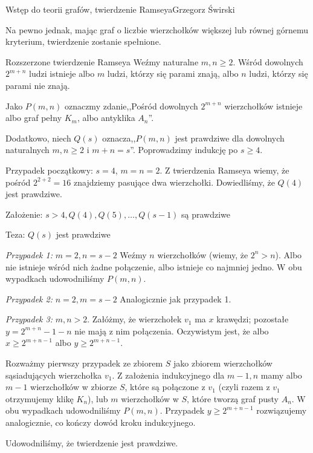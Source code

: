\begin{referat}{Wstęp do teorii grafów, twierdzenie Ramseya}{Grzegorz Świrski}
\begin{teoria}
Na pewno jednak, mając graf o liczbie wierzchołków większej lub równej górnemu kryterium, twierdzenie zostanie spełnione.

\begin{twierdzenie}{Rozszerzone twierdzenie Ramseya}
Weźmy naturalne $m, n \geq 2$. Wśród dowolnych $2^{m+n}$ ludzi istnieje albo $m$ ludzi, którzy się parami znają, albo $n$ ludzi, którzy się parami nie znają.
\end{twierdzenie}

\begin{dowod}
Jako $P(m, n)$ oznaczmy zdanie,,Pośród dowolnych $2^{m+n}$ wierzchołków istnieje albo graf pełny $K_m$, albo antyklika $A_n$''.

Dodatkowo, niech $Q(s)$ oznacza,,$P(m,n)$ jest prawdziwe dla dowolnych naturalnych $m,n \geq 2$ i $m+n = s$''. Poprowadzimy indukcję po $s \geq 4$.

Przypadek początkowy: $s = 4$, $m=n=2$. Z twierdzenia Ramseya wiemy, że pośród $2^{2+2} = 16$ znajdziemy pasujące dwa wierzchołki. Dowiedliśmy, że $Q(4)$ jest prawdziwe.

Założenie: $s > 4, Q(4), Q(5), \ldots, Q(s-1)$ są prawdziwe

Teza: $Q(s)$ jest prawdziwe

\emph{Przypadek 1:} $m=2, n=s-2$ Weźmy $n$ wierzchołków (wiemy, że $2^n > n$). Albo nie istnieje wśród nich żadne połączenie, albo istnieje co najmniej jedno. W obu wypadkach udowodniliśmy $P(m,n)$.

\emph{Przypadek 2:} $n=2, m = s-2$ Analogicznie jak przypadek 1.

\emph{Przypadek 3:} $m,n > 2$. Załóżmy, że wierzchołek $v_1$ ma $x$ krawędzi; pozostałe $y = 2^{m+n} - 1 - n$ nie mają z nim połączenia. Oczywistym jest, że albo $x \geq 2^{m+n-1}$ albo $y \geq 2^{m+n-1}$.

Rozważmy pierwszy przypadek ze zbiorem $S$ jako zbiorem wierzchołków sąsiadujących wierzchołka $v_1$. Z założenia indukcyjnego dla $m-1, n$ mamy albo $m-1$ wierzchołków w zbiorze $S$, które są połączone z $v_1$ (czyli razem z $v_1$ otrzymujemy klikę $K_n$), lub $m$ wierzchołków w $S$, które tworzą graf pusty $A_n$. W obu wypadkach udowodniliśmy $P(m,n)$. Przypadek $y \geq 2^{m+n-1}$ rozwiązujemy analogicznie, co kończy dowód kroku indukcyjnego.

Udowodniliśmy, że twierdzenie jest prawdziwe.
\end{dowod}

\end{teoria}


\end{referat}
